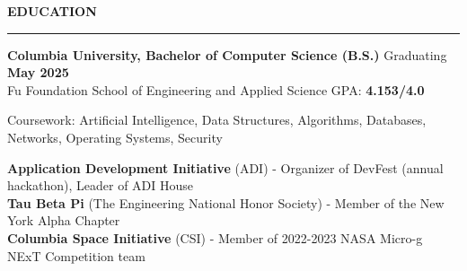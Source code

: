 \documentclass[11pt,letterpaper]{article}
\begin{document}
\medskip
\MakeUppercase{{\bf Education}}
\medskip
\hrule
\begin{list}{}{\setlength{\leftmargin}{0em}}
    \item
          {\bf Columbia University, Bachelor of Computer Science (B.S.)} \hfill  {Graduating {\bf May 2025}}\\
          Fu Foundation School of Engineering and Applied Science \hfill {GPA: {\bf 4.153/4.0}}
          
          Coursework: Artificial Intelligence, Data Structures, Algorithms, Databases, Networks, Operating Systems, Security

            {\bf Application Development Initiative} (ADI) - Organizer of DevFest (annual hackathon), Leader of ADI House \\
            {\bf Tau Beta Pi} (The Engineering National Honor Society) - Member of the New York Alpha Chapter \\
            {\bf Columbia Space Initiative} (CSI) - Member of 2022-2023 NASA Micro-g NExT Competition team
\end{list}

\end{document}
